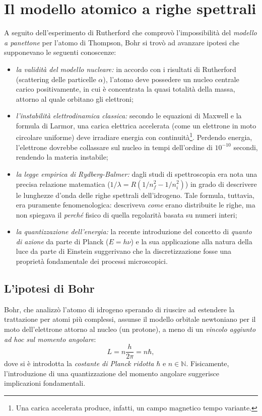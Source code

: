 \documentclass[a4paper,11pt]{report}
\begin{document}
\section{Il modello atomico a righe spettrali}
A seguito dell'esperimento di Rutherford che comprovò l'impossibilità del \textit{modello a panettone} per l'atomo di Thompson, Bohr si trovò ad avanzare ipotesi che supponevano le seguenti conoscenze: 
\begin{itemize}
    \item \textit{la validità del modello nucleare:} in accordo con i risultati di Rutherford (scattering delle particelle $\alpha$), l'atomo deve possedere un nucleo centrale carico positivamente, in cui è concentrata la quasi totalità della massa, attorno al quale orbitano gli elettroni;
    
    \item \textit{l'instabilità elettrodinamica classica:} secondo le equazioni di Maxwell e la formula di Larmor, una carica elettrica accelerata (come un elettrone in moto circolare uniforme) deve irradiare energia con continuità\footnote{Una carica accelerata produce, infatti, un campo magnetico tempo variante.}. Perdendo energia, l'elettrone dovrebbe collassare sul nucleo in tempi dell'ordine di $10^{-10}$ secondi, rendendo la materia instabile;
    
    \item \textit{la legge empirica di Rydberg-Balmer:} dagli studi di spettroscopia era nota una precisa relazione matematica ($1/\lambda = R (1/n_f^2 - 1/n_i^2)$) in grado di descrivere le lunghezze d'onda delle righe spettrali dell'idrogeno. Tale formula, tuttavia, era puramente fenomenologica: descriveva \textit{come} erano distribuite le righe, ma non spiegava il \textit{perché} fisico di quella regolarità basata su numeri interi;
    
    \item \textit{la quantizzazione dell'energia:} la recente introduzione del concetto di \textit{quanto di azione} da parte di Planck ($E=h\nu$) e la sua applicazione alla natura della luce da parte di Einstein suggerivano che la discretizzazione fosse una proprietà fondamentale dei processi microscopici.
\end{itemize}

\subsection{L'ipotesi di Bohr}
Bohr, che analizzò l'atomo di idrogeno sperando di riuscire ad estendere la trattazione per atomi più complessi, assunse il modello orbitale newtoniano per il moto dell'elettrone attorno al nucleo (un protone), a meno di un \textit{vincolo aggiunto ad hoc sul momento angolare}:
\begin{equation}
L = n\frac{h}{2\pi} = n\hbar,
\end{equation}
dove si è introdotta la \textit{costante di Planck ridotta} $\hbar$ e $n \in \mathbb{N}$. Fisicamente, l'introduzione di una quantizzazione del momento angolare suggerisce implicazioni fondamentali. 
\end{document}
